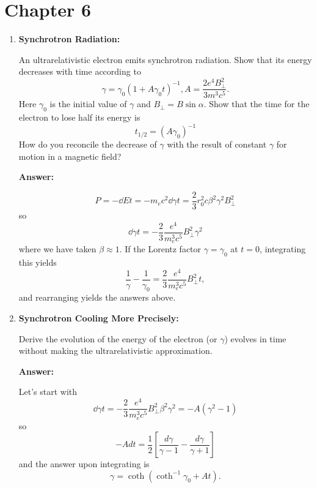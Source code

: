 \documentclass{article}
\begin{document}
\fi
\section{Chapter 6}

\begin{enumerate}
\item{\bf Synchrotron Radiation:}

An ultrarelativistic electron emits synchrotron radiation.  Show that
its energy decreases with time according to
\begin{equation}
\gamma = \gamma_0 \left ( 1 + A \gamma_0 t \right )^{-1}, A=\frac{2e^4
  B_\perp^2}{3m^3 c^5}.
\label{eq:395}
\end{equation}
Here $\gamma_0$ is the initial value of $\gamma$ and $B_\perp = B
\sin\alpha$.  Show that the time for the electron to lose half its
energy is
\begin{equation}
t_{1/2} = \left (A\gamma_0\right)^{-1}
\label{eq:396}
\end{equation}
How do you reconcile the decrease of $\gamma$ with the result of
constant $\gamma$ for motion in a magnetic field?

{\bf Answer:}

$$
P = -\dd{E}{t} = -m_e c^2 \dd{\gamma}{t} = \frac{2}{3} r_0^2 c \beta^2
\gamma^2 B_\perp^2
$$
so
$$
\dd{\gamma}{t} = -\frac{2}{3} \frac{e^4}{m_e^3 c^5} B_\perp^2 \gamma^2
$$
where we have taken $\beta\approx 1$.  If the Lorentz factor
$\gamma=\gamma_0$ at $t=0$, integrating this yields
$$
\frac{1}{\gamma} - \frac{1}{\gamma_0}  = \frac{2}{3} \frac{e^4}{m_e^3
  c^5} B_\perp^2 t,
$$
and rearranging yields the answers above.

\item{\bf Synchrotron Cooling More Precisely:}

Derive the evolution of the energy of the electron (or $\gamma$)
evolves in time without making the ultrarelativistic approximation.

{\bf Answer:}

Let's start with
$$
\dd{\gamma}{t} = -\frac{2}{3} \frac{e^4}{m_e^3 c^5} B_\perp^2 \beta^2
\gamma^2 = -A (\gamma^2 -1 )
$$
so
$$
-A dt = \frac{1}{2} \left [ \frac{d\gamma}{\gamma-1} -
  \frac{d\gamma}{\gamma+1} \right ]
$$
and the answer upon integrating is
$$
\gamma = \coth \left ( \coth^{-1} \gamma_0 + A t \right ) .
$$

\end{enumerate}

\ifx\bookloaded\undefined
\end{document}
